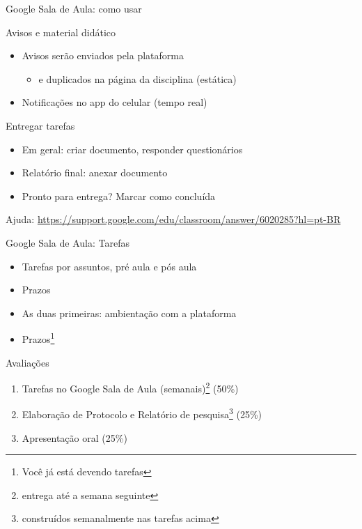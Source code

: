 \documentclass{beamer}
\begin{document}
\begin{frame}{Google Sala de Aula: como usar}
  \begin{block}{Avisos e material didático}
    \begin{itemize}
      \small
    \item Avisos serão enviados pela plataforma
      \begin{itemize}
        \tiny
      \item e duplicados na página da disciplina (estática)
      \end{itemize}
      \smallskip
    \item Notificações no app do celular (tempo real)
    \end{itemize}
  \end{block}
  \begin{block}{Entregar tarefas}
    \small
    \begin{itemize}
      \small
    \item Em geral: criar documento, responder questionários
      \smallskip
    \item Relatório final: anexar documento
      \smallskip
    \item Pronto para entrega? Marcar como concluída
      \bigskip
    \end{itemize}
    \begin{center}
      Ajuda: {\tiny \url{https://support.google.com/edu/classroom/answer/6020285?hl=pt-BR}}
    \end{center}
  \end{block}
\end{frame}

\begin{frame}{Google Sala de Aula: Tarefas}
  \begin{itemize}
    \small
  \item Tarefas por assuntos, pré aula e pós aula
    \bigskip
  \item Prazos
    \bigskip
  \item As duas primeiras: ambientação com a plataforma
    \bigskip
  \item Prazos\footnote{Você já está devendo tarefas}
  \end{itemize}
\end{frame}

\begin{frame}{Avaliações}
  \begin{enumerate}
    \small
  \item Tarefas no Google Sala de Aula (semanais)\footnote{entrega até a semana seguinte} (50\%)
    \bigskip
  \item Elaboração de Protocolo e Relatório de pesquisa\footnote{construídos semanalmente nas tarefas acima} (25\%)
    \bigskip
  \item Apresentação oral (25\%)
  \end{enumerate}
\end{frame}
\end{document}
